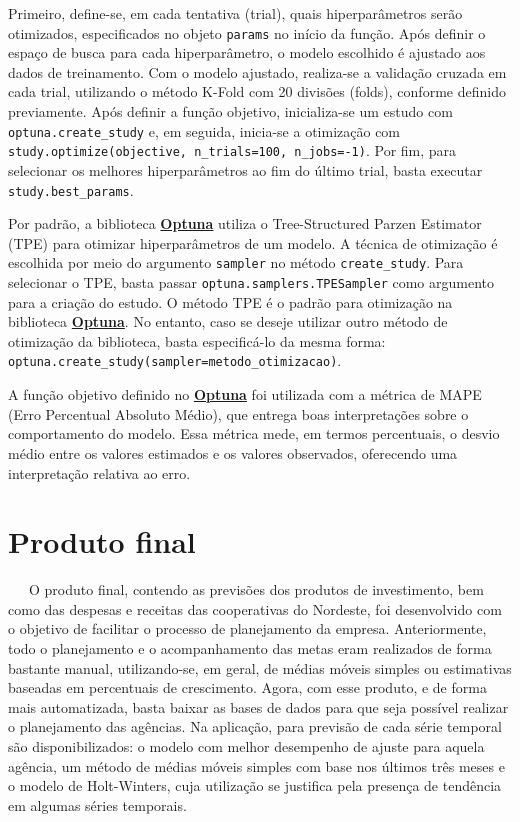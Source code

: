 \documentclass[
  12pt,
  a4paper,
]{scrreprt}
\begin{document}
Primeiro, define-se, em cada tentativa (trial), quais hiperparâmetros
serão otimizados, especificados no objeto \texttt{params} no início da
função. Após definir o espaço de busca para cada hiperparâmetro, o
modelo escolhido é ajustado aos dados de treinamento. Com o modelo
ajustado, realiza-se a validação cruzada em cada trial, utilizando o
método K-Fold com 20 divisões (folds), conforme definido previamente.
Após definir a função objetivo, inicializa-se um estudo com
\texttt{optuna.create\_study} e, em seguida, inicia-se a otimização com
\texttt{study.optimize(objective,\ n\_trials=100,\ n\_jobs=-1)}. Por
fim, para selecionar os melhores hiperparâmetros ao fim do último trial,
basta executar \texttt{study.best\_params}.

\vspace{12pt}

Por padrão, a biblioteca \href{https://optuna.org/}{\textbf{Optuna}}
utiliza o Tree-Structured Parzen Estimator (TPE) para otimizar
hiperparâmetros de um modelo. A técnica de otimização é escolhida por
meio do argumento \texttt{sampler} no método \texttt{create\_study}.
Para selecionar o TPE, basta passar \texttt{optuna.samplers.TPESampler}
como argumento para a criação do estudo. O método TPE é o padrão para
otimização na biblioteca \href{https://optuna.org/}{\textbf{Optuna}}. No
entanto, caso se deseje utilizar outro método de otimização da
biblioteca, basta especificá-lo da mesma forma:
\texttt{optuna.create\_study(sampler=metodo\_otimizacao)}.

\vspace{12pt}

A função objetivo definido no
\href{https://optuna.org/}{\textbf{Optuna}} foi utilizada com a métrica
de MAPE (Erro Percentual Absoluto Médio), que entrega boas
interpretações sobre o comportamento do modelo. Essa métrica mede, em
termos percentuais, o desvio médio entre os valores estimados e os
valores observados, oferecendo uma interpretação relativa ao erro.

\chapter{Produto final}\label{produto-final}

~~~O produto final, contendo as previsões dos produtos de investimento,
bem como das despesas e receitas das cooperativas do Nordeste, foi
desenvolvido com o objetivo de facilitar o processo de planejamento da
empresa. Anteriormente, todo o planejamento e o acompanhamento das metas
eram realizados de forma bastante manual, utilizando-se, em geral, de
médias móveis simples ou estimativas baseadas em percentuais de
crescimento. Agora, com esse produto, e de forma mais automatizada,
basta baixar as bases de dados para que seja possível realizar o
planejamento das agências. Na aplicação, para previsão de cada série
temporal são disponibilizados: o modelo com melhor desempenho de ajuste
para aquela agência, um método de médias móveis simples com base nos
últimos três meses e o modelo de Holt-Winters, cuja utilização se
justifica pela presença de tendência em algumas séries temporais.
\end{document}
